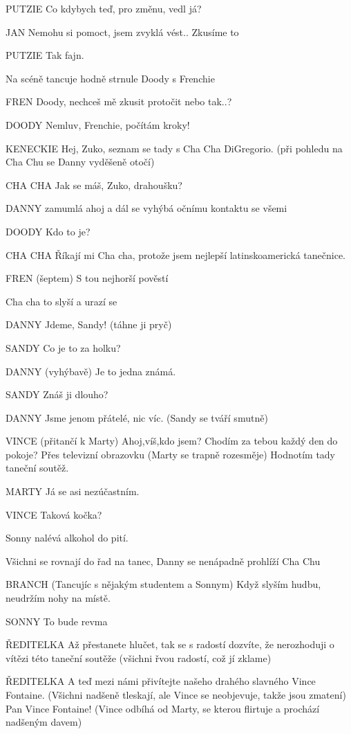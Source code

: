 PUTZIE        Co kdybych teď, pro změnu, vedl já?

JAN        Nemohu si pomoct, jsem zvyklá vést.. Zkusíme to

PUTZIE        Tak fajn. 

Na scéně tancuje hodně strnule Doody s Frenchie

FREN        Doody, nechceš mě zkusit protočit nebo tak..?

DOODY        Nemluv, Frenchie, počítám kroky! 

KENECKIE        Hej, Zuko, seznam se tady s Cha Cha DiGregorio. (při pohledu na Cha         Chu se Danny vyděšeně otočí)

CHA CHA         Jak se máš, Zuko, drahoušku?

DANNY        zamumlá ahoj a dál se vyhýbá očnímu kontaktu se všemi 

DOODY        Kdo to je? 

CHA CHA        Říkají mi Cha cha, protože jsem nejlepší latinskoamerická tanečnice. 

FREN        (šeptem) S tou nejhorší pověstí

Cha cha to slyší a urazí se 

DANNY        Jdeme, Sandy! (táhne ji pryč)

SANDY         Co je to za holku? 

DANNY        (vyhýbavě) Je to jedna známá.  

SANDY        Znáš ji dlouho? 

DANNY        Jsme jenom přátelé, nic víc. (Sandy se tváří smutně) 

VINCE        (přitančí k Marty) Ahoj,víš,kdo jsem? Chodím za tebou každý den do pokoje? Přes televizní obrazovku (Marty se trapně rozesměje) Hodnotím tady taneční soutěž. 

MARTY        Já se asi nezúčastním.

VINCE        Taková kočka? 

Sonny nalévá alkohol do pití.

Všichni se rovnají do řad na tanec, Danny se nenápadně prohlíží Cha Chu 

BRANCH (Tancujíc s nějakým studentem a Sonnym) Když slyším hudbu, neudržím nohy na místě. 

SONNY        To bude revma

ŘEDITELKA         Až přestanete hlučet, tak se s radostí dozvíte, že nerozhoduji o vítězi této taneční soutěže (všichni řvou radostí, což jí zklame) 

ŘEDITELKA        A teď mezi námi přivítejte našeho drahého slavného Vince Fontaine. (Všichni nadšeně tleskají, ale Vince se neobjevuje, takže jsou zmatení) Pan Vince Fontaine! (Vince odbíhá od Marty, se kterou flirtuje a prochází nadšeným davem) 

